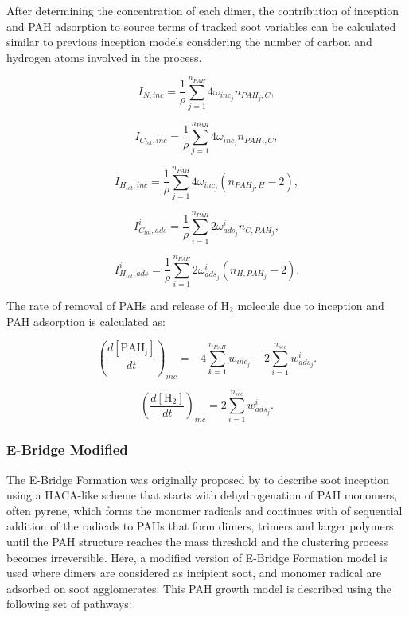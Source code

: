 After determining the concentration of each dimer, the contribution of inception and PAH adsorption to source terms of tracked soot variables can be calculated similar to previous inception models considering the number of carbon and hydrogen atoms involved in the process.

\begin{equation}
	I_{N,{inc}} = \frac{1}{\rho}
	\sum_{j=1}^{n_{PAH}}
	4\omega_{inc_{j}} 
	n_{PAH_j,C}
	\label{eqn:IN_inc_dimcoal},
\end{equation}

\begin{equation}
	I_{C_{tot},{inc}} = \frac{1}{\rho}
	\sum_{j=1}^{n_{PAH}}
	4\omega_{inc_{j}} 
	n_{PAH_j,C}
	\label{eqn:ICtot_inc_dimcoal},
\end{equation}

\begin{equation}
	I_{H_{tot},{inc}} = \frac{1}{\rho}
	\sum_{j=1}^{n_{PAH}}
	4\omega_{inc_{j}} 
	\left(
	n_{PAH_j,H}-2
	\right)
	\label{eqn:IHtot_inc_dimcoal},
\end{equation}

\begin{equation}
	I^i_{C_{tot},ads} =
	\frac{1}{\rho}
	\sum_{i=1}^{n_{PAH}}
	2\omega^i_{ads_j}
	n_{C,PAH_j}
	\label{eqn:ICtotads_dimcoal},
\end{equation}

\begin{equation}
	I^i_{H_{tot},ads} =
	\frac{1}{\rho}
	\sum_{i=1}^{n_{PAH}}
	2\omega^i_{ads_j}
	\left(n_{H,PAH_j}-2\right)
	\label{eqn:IHtotads_dimcoal}.
\end{equation}

The rate of removal of PAHs and release of $\mathrm{H_2}$ molecule due to inception and PAH adsorption is calculated as:

\begin{equation}
	\left(
	\frac{d\left[{\mathrm{PAH_j}}\right]}{dt}
	\right)_{inc}
	= 
	-4\sum_{k=1}^{n_{PAH}}w_{inc_{j}}-2\sum_{i=1}^{n_{sec}}w^i_{ads_j}
	\label{eqn:PAHscrub_dimcoal}.
\end{equation}

\begin{equation}
	\left(
	\frac{d\left[{\mathrm{H_2}}\right]}{dt}
	\right)_{inc}
	= 
	2\sum_{i=1}^{n_{sec}}w^i_{ads_j}
	\label{eqn:H2scrub_dimcoal}.
\end{equation}

\subsubsection{E-Bridge Modified}
The E-Bridge Formation was originally proposed by \citet{frenklach2020mechanism} to describe soot inception using a HACA-like scheme that starts with dehydrogenation of PAH monomers, often pyrene, which forms the monomer radicals and continues with of sequential addition of the radicals to PAHs that form dimers, trimers and larger polymers until the PAH structure reaches the mass threshold and the clustering process becomes irreversible. Here, a modified version of E-Bridge Formation model is used where dimers are considered as incipient soot, and monomer radical are adsorbed on soot agglomerates. This PAH growth model is described using the following set of pathways:

